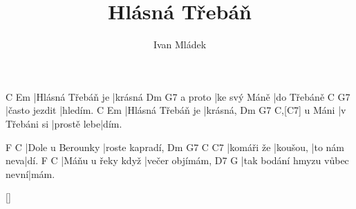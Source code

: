 \documentclass{song}
\title{Hlásná Třebáň}
\author{Ivan Mládek}
\begin{document}
C                 Em
|Hlásná Třebáň je |krásná
        Dm           G7
a proto |ke svý Máně |do Třebáně
C             G7
|často jezdit |hledím.
C                 Em
|Hlásná Třebáň je |krásná,
       Dm            G7         C,[C7]
u Máni |v Třebáni si |prostě lebe|dím.
\endstrophe
 
\strophe
F                C
|Dole u Berounky |roste kapradí,
Dm         G7      C           C7
|komáři že |koušou, |to nám neva|dí.
F                 C
|Máňu u řeky když |večer objímám,
D7                          G
|tak bodání hmyzu vůbec nevní|mám.
\endstrophe
 

\ref{}
\end{document}
